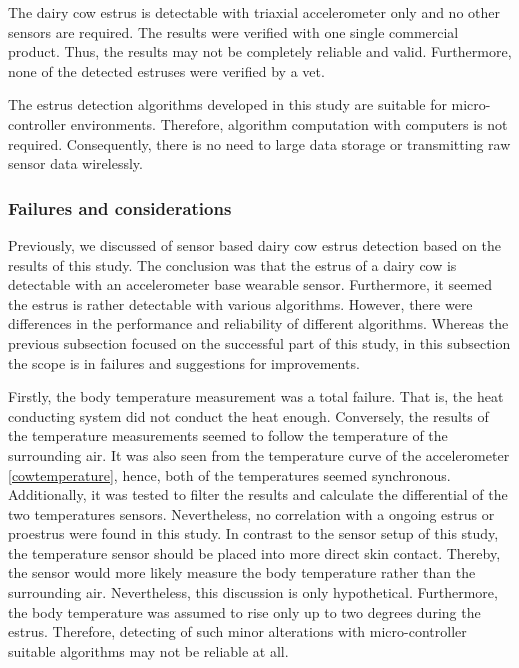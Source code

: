 \documentclass[english,12pt,a4paper,pdftex,elec,utf8]{aaltothesis}
\begin{document}
The dairy cow estrus is detectable with triaxial accelerometer only and no other sensors are required. The results were verified with one single commercial product. Thus, the results may not be completely reliable and valid. Furthermore, none of the detected estruses were verified by a vet.

The estrus detection algorithms developed in this study are suitable for micro-controller environments. Therefore, algorithm computation with computers is not required. Consequently, there is no need to large data storage or transmitting raw sensor data wirelessly.


\subsubsection{Failures and considerations}

Previously, we discussed of sensor based dairy cow estrus detection based on the results of this study. The conclusion was that the estrus of a dairy cow is detectable with an accelerometer base wearable sensor. Furthermore, it seemed the estrus is rather detectable with various algorithms. However, there were differences in the performance and reliability of different algorithms. Whereas the previous subsection focused on the successful part of this study, in this subsection the scope is in failures and suggestions for improvements.

Firstly, the body temperature measurement was a total failure. That is, the heat conducting system did not conduct the heat enough. Conversely, the results of the temperature measurements seemed to follow the temperature of the surrounding air. It was also seen from the temperature curve of the accelerometer \ref{cowtemperature}, hence, both of the temperatures seemed synchronous. Additionally, it was tested to filter the results and calculate the differential of the two temperatures sensors. Nevertheless, no correlation with a ongoing estrus or proestrus were found in this study. In contrast to the sensor setup of this study, the temperature sensor should be placed into more direct skin contact. Thereby, the sensor would more likely measure the body temperature rather than the surrounding air. Nevertheless, this discussion is only hypothetical. Furthermore, the body temperature was assumed to rise only up to two degrees during the estrus. Therefore, detecting of such minor alterations with micro-controller suitable algorithms may not be reliable at all.
\end{document}
